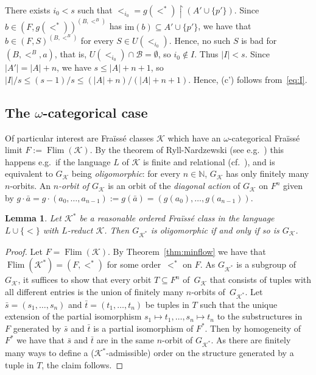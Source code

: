 \documentclass[12pt]{amsart}
\theoremstyle{plain}
\newtheorem{lemma}[theorem]{Lemma}
\theoremstyle{definition}
\begin{document}
There exists $i_0<s$ such that $<_{i_0}=g(<^*)\upharpoonright (A'\cup\{p'\})$. Since 
$b\in (F,g(<^*))^{(B,<^B)}$ has  ${\mathrm{im}}(b)\subseteq A'\cup\{p'\}$, 
we have that $b\in (F,S)^{(B,<^B)}$ for every $S\in U(<_{i_0})$. Hence, no such $S$ is bad for $(B,<^B,a)$, that is, 
$U(<_{i_0})\cap\mathcal B=\emptyset$, so $i_0\notin I$. Thus 
$|I|<s$. Since $|A'|=|A|+n$, we have $s\le |A|+n+1$, so $|I|/s\le (s-1)/s\le (|A|+n)/(|A|+n+1)$. Hence, (c') follows from~\eqref{eq:I}.

\subsection{The $\omega$-categorical case}\label{sec:cor2}
Of particular interest are Fra\"iss\'e classes
${\mathcal K}$ which have an $\omega$-categorical Fra\"iss\'e 
limit $F:=\operatorname{Flim}({\mathcal K})$. By the theorem of Ryll-Nardzewski (see e.g.\ \cite[T4.3.1]{zieglerbuch}) this happens e.g.\ if 
the language $L$ of ${\mathcal K}$ is finite and relational (cf.~\cite[T4.4.7]{zieglerbuch}), and 
is equivalent to $G_{\mathcal K}$ being {\em oligomorphic}: 
for every $n\in\mathbb N$, $G_{\mathcal K}$ has only finitely 
many $n$-orbits. An {\em $n$-orbit of $G_{\mathcal K}$} is an orbit of the {\em diagonal action} of $G_{\mathcal K}$ on $F^n$ given by 
$g\cdot \bar a=g\cdot (a_0,\ldots, a_{n-1}):= g(\bar a)=(g(a_0),\ldots, g(a_{n-1}))$. 

\begin{lemma}\label{lem:forgetoligo}
 Let ${\mathcal K}^*$ be a reasonable ordered Fra\"iss\'e class in the 
language $L\cup\{<\}$ with $L$-reduct ${\mathcal K}$. Then $G_{{\mathcal K}^*}$ is oligomorphic if and only if so is $G_{\mathcal K}$.
\end{lemma}

\begin{proof}
Let $F=\operatorname{Flim}({\mathcal K})$. By Theorem~\ref{thm:minflow} we have that $\operatorname{Flim}({\mathcal K}^*)=(F, <^*)$ for 
some order~$<^*$ on $F$. As $G_{{\mathcal K}^*}$ is a subgroup of $G_{\mathcal K}$, it suffices to show that
 every orbit $T\subseteq F^n$ of~$G_{\mathcal K}$ that consists of tuples with all different entries 
is the union of finitely many $n$-orbits of~$G_{{\mathcal K}^*}$. Let $\bar s=(s_1, \ldots, s_n)$ and $\bar t=(t_1, \ldots, t_n)$
 be tuples in $T$ such that the unique extension of the partial isomorphism $s_1\mapsto t_1, \ldots, s_n\mapsto t_n$ to 
the substructures in~$F$ generated by $\bar s$ and $\bar t$ is a partial isomorphism of $F^*$. Then by homogeneity of $F^*$
 we have that $\bar s$ and $\bar t$ are in the same $n$-orbit of $G_{{\mathcal K}^*}$. As there are finitely many ways to define
 a (${\mathcal K}^*$-admissible) order on the structure generated by a tuple in $T$, the claim follows.
\end{proof}
\end{document}
